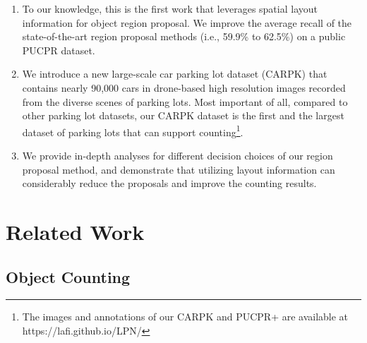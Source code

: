 \documentclass[10pt,twocolumn,letterpaper]{article}
\begin{document}
\begin{enumerate}
\item To our knowledge, this is the first work that leverages spatial layout information for object region proposal. We improve the average recall of the state-of-the-art region proposal methods (i.e., 59.9\% \cite{21_ren2015faster} to 62.5\%) on a public PUCPR dataset.

\item We introduce a new large-scale car parking lot dataset (CARPK) that contains nearly 90,000 cars in drone-based high resolution images recorded from the diverse scenes of parking lots. 
%
Most important of all, compared to other parking lot datasets, our CARPK dataset is the first and the largest dataset of parking lots that can support counting\footnote{The images and annotations of our CARPK and PUCPR+ are available at https://lafi.github.io/LPN/}.

\item We provide in-depth analyses for different decision choices of our region proposal method, and demonstrate that utilizing layout information can considerably reduce the proposals and improve the counting results.
\end{enumerate}

\section{Related Work}


\subsection{Object Counting}
\end{document}
